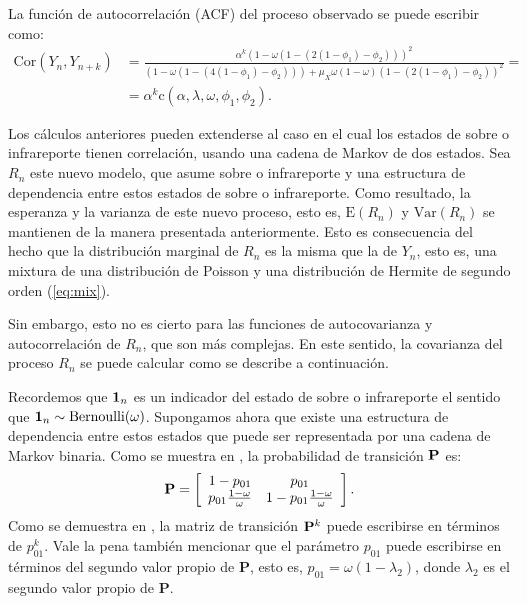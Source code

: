 \documentclass[12pt,twoside]{article} %
\begin{document}
\medskip

\noindent La función de autocorrelación (ACF) del proceso observado se puede escribir como:
\begin{align*}
\textrm{Cor}\left(Y_n,Y_{n+k}\right)&=\frac{\alpha^k(1-\omega(1-\left(2(1-\phi_1)-\phi_2\right)))^2}{\left(1-\omega\left(1-\left(4\left(1-\phi_1\right)-\phi_2\right)\right)\right)+\mu_X\omega(1-\omega)\left(1-\left(2\left(1-\phi_1\right)-\phi_2\right)\right)^2}=\\
&=\alpha^k \textrm{c}(\alpha,\lambda,\omega,\phi_1,\phi_2).
\end{align*}

\medskip

\noindent Los cálculos anteriores pueden extenderse al caso en el cual los estados de sobre o infrareporte tienen correlación, usando una cadena de Markov de dos estados. Sea $R_n$ este nuevo modelo, que asume sobre o infrareporte y una estructura de dependencia entre estos estados de sobre o infrareporte. Como resultado, la esperanza y la varianza de este nuevo proceso, esto es, $\textrm{E}(R_n)$ y $\textrm{Var}(R_n)$ se mantienen de la manera presentada anteriormente. Esto es consecuencia del hecho que la distribución marginal de $R_n$ es la misma que la de $Y_n$, esto es, una mixtura de una distribución de Poisson y una distribución de Hermite de segundo orden (\ref{eq:mix}). 

\medskip

\noindent Sin embargo, esto no es cierto para las funciones de autocovarianza y autocorrelación de $R_n$, que son más complejas. En este sentido, la covarianza del proceso $R_n$ se puede calcular como se describe a continuación. 

\medskip

\noindent Recordemos que ${\bf 1}_n$ es un indicador del estado de sobre o infrareporte el sentido que ${\bf 1}_n \sim \textrm{Bernoulli}(\omega)$. Supongamos ahora que existe una estructura de dependencia entre estos estados que puede ser representada por una cadena de Markov binaria. Como se muestra en \cite{FernandezFontelo2019}, la probabilidad de transición ${\bf P}$ es: 
 \[
   {\bf P}=
  \left[ {\begin{array}{cc}
   1-p_{01} & p_{01} \\
   p_{01}\frac{1-\omega}{\omega} & 1-p_{01}\frac{1-\omega}{\omega} \\
  \end{array} } \right]. 
\]
Como se demuestra en \cite{FernandezFontelo2019}, la matriz de transición ${\bf P}^k$ puede escribirse en términos de $p_{01}^k$. Vale la pena también mencionar que el parámetro $p_{01}$ puede escribirse en términos del segundo valor propio de {\bf P}, esto es, $p_{01}=\omega(1-\lambda_2)$, donde $\lambda_2$ es el segundo valor propio de {\bf P}. 
\end{document}
